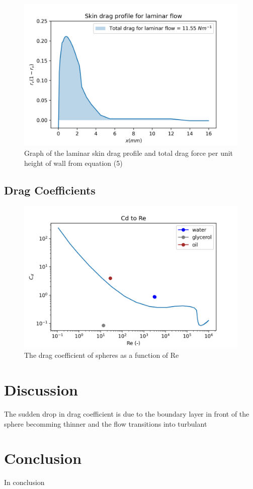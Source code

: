 \documentclass{article}
\begin{document}
\begin{figure}[H]
\centering
\includegraphics[width=1\textwidth]{laminar_drag.png}
\caption{\label{fig:laminar_drag} Graph of the laminar skin drag profile and total drag force per unit height of wall from equation (5)}
\end{figure}

\subsection{Drag Coefficients}

\begin{figure}[H]
\centering
\includegraphics[width=1\textwidth]{CdRe_graph.png}
\caption{\label{fig:CdRe_graph} The drag coefficient of spheres as a function of Re}
\end{figure}

\section{Discussion}

The sudden drop in drag coefficient is due to the boundary layer in front of the sphere becomming thinner and the flow transitions into turbulant 


\section{Conclusion}

In conclusion
\end{document}
